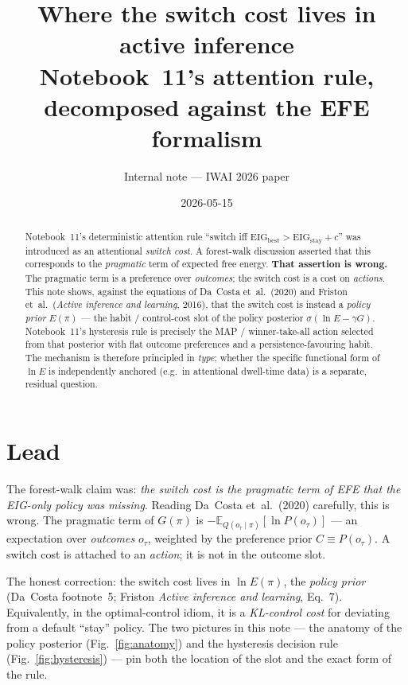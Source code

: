\documentclass[11pt,a4paper]{article}
\title{Where the switch cost lives in active inference\\[2pt]
\large Notebook~11's attention rule, decomposed against the EFE formalism}
\author{Internal note --- IWAI 2026 paper}
\date{2026-05-15}
\theoremstyle{plain}
\begin{document}
\maketitle

\begin{abstract}
Notebook~11's deterministic attention rule
``switch iff $\mathrm{EIG}_{\mathrm{best}} > \mathrm{EIG}_{\mathrm{stay}} + c$''
was introduced as an attentional \emph{switch cost}. A forest-walk
discussion asserted that this corresponds to the \emph{pragmatic} term of
expected free energy. \textbf{That assertion is wrong.} The pragmatic
term is a preference over \emph{outcomes}; the switch cost is a cost on
\emph{actions}. This note shows, against the equations of
Da~Costa et~al.~(2020) and Friston et~al.\ (\emph{Active inference and
learning}, 2016), that the switch cost is instead a \emph{policy prior}
$E(\pi)$ --- the habit / control-cost slot of the policy posterior
$\sigma(\ln E - \gamma G)$. Notebook~11's hysteresis rule is precisely
the MAP / winner-take-all action selected from that posterior with flat
outcome preferences and a persistence-favouring habit. The mechanism is
therefore principled in \emph{type}; whether the specific functional
form of $\ln E$ is independently anchored (e.g.\ in attentional
dwell-time data) is a separate, residual question.
\end{abstract}

\section{Lead}

The forest-walk claim was: \emph{the switch cost is the pragmatic term
of EFE that the EIG-only policy was missing}. Reading Da~Costa
et~al.~(2020) carefully, this is wrong. The pragmatic term of $G(\pi)$
is $-\mathbb{E}_{Q(o_\tau\mid\pi)}[\ln P(o_\tau)]$ --- an expectation
over \emph{outcomes} $o_\tau$, weighted by the preference prior
$C \equiv P(o_\tau)$. A switch cost is attached to an \emph{action}; it
is not in the outcome slot.

The honest correction: the switch cost lives in $\ln E(\pi)$, the
\emph{policy prior} (Da~Costa footnote~5; Friston \emph{Active inference
and learning}, Eq.~7). Equivalently, in the optimal-control idiom, it
is a \emph{KL-control cost} for deviating from a default ``stay''
policy. The two pictures in this note --- the anatomy of the policy
posterior (Fig.~\ref{fig:anatomy}) and the hysteresis decision rule
(Fig.~\ref{fig:hysteresis}) --- pin both the location of the slot and
the exact form of the rule.
\end{document}
